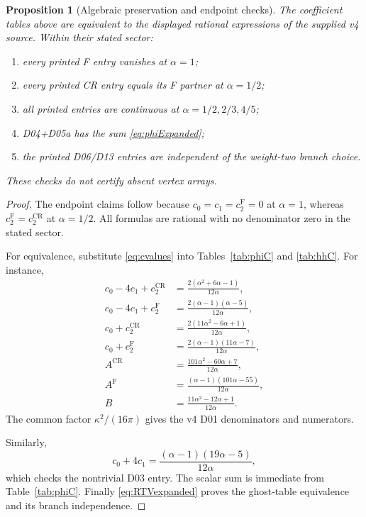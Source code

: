 \documentclass[11pt,a4paper]{article}
\newcommand{\ka}{\kappa}
\newcommand{\Fr}{\mathrm F}
\newcommand{\CR}{\mathrm{CR}}
\theoremstyle{plain}
\newtheorem{proposition}[theorem]{Proposition}
\theoremstyle{definition}
\theoremstyle{remark}
\numberwithin{equation}{section}
\begin{document}
\begin{proposition}[Algebraic preservation and endpoint checks]
\label{prop:polynomialchecks}
The coefficient tables above are equivalent to the displayed
rational expressions of the supplied v4 source.
Within their stated sector:
\begin{enumerate}[label=\textup{(\roman*)}]
\item every printed F entry vanishes at \(\alpha=1\);
\item every printed CR entry equals its F partner at
\(\alpha=1/2\);
\item all printed entries are continuous at
\(\alpha=1/2,2/3,4/5\);
\item D04+D05a has the sum \eqref{eq:phiExpanded};
\item the printed D06/D13 entries are independent of the
weight-two branch choice.
\end{enumerate}
These checks do not certify absent vertex arrays.
\end{proposition}

\begin{proof}
The endpoint claims follow because
\(c_0=c_1=c_2^\Fr=0\) at \(\alpha=1\), whereas
\(c_2^\Fr=c_2^\CR\) at \(\alpha=1/2\).
All formulas are rational with no denominator zero in the stated
sector.

For equivalence, substitute \eqref{eq:cvalues} into
Tables~\ref{tab:phiC} and \ref{tab:hhC}.
For instance,
\begin{align*}
c_0-4c_1+c_2^\CR
 &=\frac{2(\alpha^2+6\alpha-1)}{12\alpha},\\
c_0-4c_1+c_2^\Fr
 &=\frac{2(\alpha-1)(\alpha-5)}{12\alpha},\\
c_0+c_2^\CR
 &=\frac{2(11\alpha^2-6\alpha+1)}{12\alpha},\\
c_0+c_2^\Fr
 &=\frac{2(\alpha-1)(11\alpha-7)}{12\alpha},\\
A^\CR
 &=\frac{101\alpha^2-60\alpha+7}{12\alpha},\\
A^\Fr
 &=\frac{(\alpha-1)(101\alpha-55)}{12\alpha},\\
B&=\frac{11\alpha^2-12\alpha+1}{12\alpha}.
\end{align*}
The common factor \(\ka^2/(16\pi)\) gives the v4
D01 denominators and numerators.

Similarly,
\[
c_0+4c_1
 =\frac{(\alpha-1)(19\alpha-5)}{12\alpha},
\]
which checks the nontrivial D03 entry.
The scalar sum is immediate from Table~\ref{tab:phiC}.
Finally \eqref{eq:RTVexpanded} proves the ghost-table equivalence
and its branch independence.
\end{proof}
\end{document}
